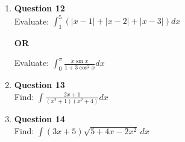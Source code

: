 \documentclass[12pt]{article}
\begin{document}
\begin{enumerate}
\item \textbf{Question 12} \\
Evaluate:  
$
\int_1^5 ( |x - 1| + |x - 2| + |x - 3| ) dx
$
\begin{center}
\textbf{OR} \\
\end{center}
Evaluate:  
$
\int_0^{\pi} \frac{x \sin x}{1 + 3 \cos^2 x} dx
$

\item \textbf{Question 13} \\
Find:  
$
\int \frac{2x + 1}{(x^2 + 1)(x^2 + 4)} dx
$

\item \textbf{Question 14} \\
Find:  
$
\int (3x + 5)\sqrt{5 + 4x - 2x^2} \, dx
$

\end{enumerate}
\end{document}
